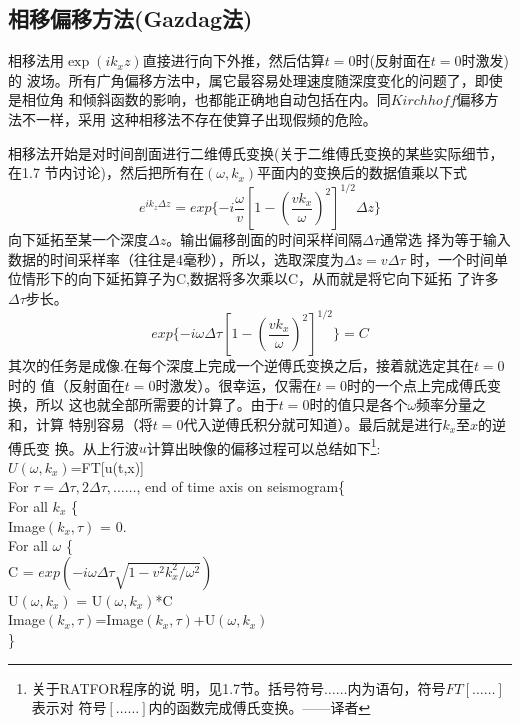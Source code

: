 \subsection{相移偏移方法(Gazdag法)}
\label{sec:1.5}

相移法用$\exp(ik_xz)$直接进行向下外推，然后估算$t=0$时(反射面在$t=0$时激发)的
波场。所有广角偏移方法中，属它最容易处理速度随深度变化的问题了，即使是相位角
和倾斜函数的影响，也都能正确地自动包括在内。同$Kirchhoff$偏移方法不一样，采用
这种相移法不存在使算子出现假频的危险。

相移法开始是对时间剖面进行二维傅氏变换(关于二维傅氏变换的某些实际细节，在1.7
节内讨论)，然后把所有在$(\omega,k_x)$平面内的变换后的数据值乘以下式
\begin{equation}
e^{ik_z\Delta z}=exp\{-i\frac{\omega}{v}[1-(\frac{vk_x}{\omega})^2]^{1/2}\Delta z\}
\label{eq:ex1.3.4}
\end{equation}
向下延拓至某一个深度$\Delta z$。输出偏移剖面的时间采样间隔$\Delta\tau$通常选
择为等于输入数据的时间采样率（往往是4毫秒），所以，选取深度为$\Delta z=v\Delta\tau$
时，一个时间单位情形下的向下延拓算子为C,数据将多次乘以C，从而就是将它向下延拓
了许多$\Delta\tau$步长。
\begin{equation}
exp\{-i\omega\Delta\tau[1-(\frac{vk_x}{\omega})^2]^{1/2}\}=C
\label{eq:ex1.3.5}
\end{equation}
其次的任务是成像.在每个深度上完成一个逆傅氏变换之后，接着就选定其在$t=0$时的
值（反射面在$t=0$时激发）。很幸运，仅需在$t=0$时的一个点上完成傅氏变换，所以
这也就全部所需要的计算了。由于$t=0$时的值只是各个$\omega$频率分量之和，计算
特别容易（将$t=0$代入逆傅氏积分就可知道）。最后就是进行$k_x$至$x$的逆傅氏变
换。从上行波$u$计算出映像的偏移过程可以总结如下\footnote{关于RATFOR程序的说
明，见1.7节。括号符号${\ldots\ldots}$内为语句，符号$FT[\ldots\ldots]$表示对
符号$[\ldots\ldots]$内的函数完成傅氏变换。——译者}:\\
$U(\omega,k_x)$=FT[u(t,x)]\\
For $\tau=\Delta\tau,2\Delta\tau,\ldots\ldots$, end of time axis on seismogram\{\\
For all $k_x$ \{\\
 Image$(k_x,\tau)$ = 0.\\
		For all $\omega$ \{\\
			C = $exp(-i\omega\Delta\tau\sqrt{1-v^2k_x^2/\omega^2})$\\
			U$(\omega,k_x)$ = U$(\omega,k_x)$*C\\
			Image$(k_x,\tau)$=Image$(k_x,\tau)$+U$(\omega,k_x)$\\
		\}\\

